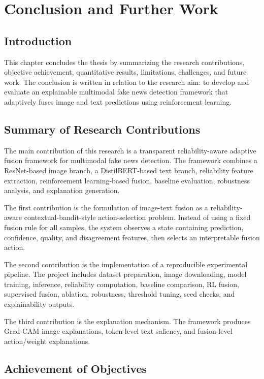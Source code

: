 \chapter{Conclusion and Further Work}


\section{Introduction}


This chapter concludes the thesis by summarizing the research contributions, objective achievement, quantitative results, limitations, challenges, and future work. The conclusion is written in relation to the research aim: to develop and evaluate an explainable multimodal fake news detection framework that adaptively fuses image and text predictions using reinforcement learning.


\section{Summary of Research Contributions}


The main contribution of this research is a transparent reliability-aware adaptive fusion framework for multimodal fake news detection. The framework combines a ResNet-based image branch, a DistilBERT-based text branch, reliability feature extraction, reinforcement learning-based fusion, baseline evaluation, robustness analysis, and explanation generation.


The first contribution is the formulation of image-text fusion as a reliability-aware contextual-bandit-style action-selection problem. Instead of using a fixed fusion rule for all samples, the system observes a state containing prediction, confidence, quality, and disagreement features, then selects an interpretable fusion action.


The second contribution is the implementation of a reproducible experimental pipeline. The project includes dataset preparation, image downloading, model training, inference, reliability computation, baseline comparison, RL fusion, supervised fusion, ablation, robustness, threshold tuning, seed checks, and explainability outputs.


The third contribution is the explanation mechanism. The framework produces Grad-CAM image explanations, token-level text saliency, and fusion-level action/weight explanations.


\section{Achievement of Objectives}


